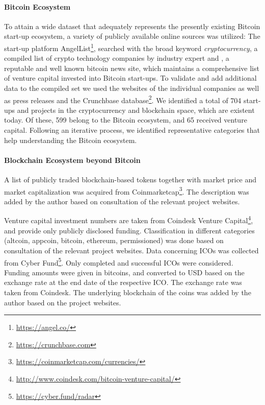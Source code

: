 \paragraph{Bitcoin Ecosystem}

To attain a wide dataset that adequately 
represents the presently existing Bitcoin start-up ecosystem, a variety of publicly available online sources was utilized: The start-up platform AngelList\footnote{\url{https://angel.co/}}, 
searched with the broad keyword \emph{cryptocurrency}, a compiled list of crypto technology 
companies by industry expert \cite{Mougayar2015} and \cite{Coindesk2015}, a reputable 
and well known bitcoin news site, which maintains a comprehensive list of venture 
capital invested into Bitcoin start-ups. To validate and add additional data to 
the compiled set we used the websites of the individual companies as well as press 
releases and the Crunchbase database\footnote{\url{https://crunchbase.com}}. We identified a total of 704 start-ups 
and projects in the cryptocurrency and blockchain space, which are existent today. 
Of these, 599 belong to the Bitcoin ecosystem, and 65 received venture capital. 
Following an iterative process, we identified representative categories that help 
understanding the Bitcoin ecosystem. 

\paragraph{Blockchain Ecosystem beyond Bitcoin}
A list of publicly traded blockchain-based tokens together with market price and market capitalization was acquired from Coinmarketcap\footnote{\url{https://coinmarketcap.com/currencies/}}. The description was added by the author based on consultation of the relevant project websites. 

Venture capital investment numbers are taken from Coindesk Venture Capital\footnote{\url{http://www.coindesk.com/bitcoin-venture-capital/}}, and provide only publicly disclosed funding. Classification in different categories (altcoin, appcoin, bitcoin, ethereum, permissioned) was done based on consultation of the relevant project websites. Data concerning \ac{ICO}s was collected from Cyber Fund\footnote{\url{https://cyber.fund/radar}}. Only completed and successful \ac{ICO}s were considered. Funding amounts were given in bitcoins, and converted to USD based on the exchange rate at the end date of the respective \ac{ICO}. The exchange rate was taken from Coindesk. The underlying blockchain of the coins was added by the author based on the project websites.

